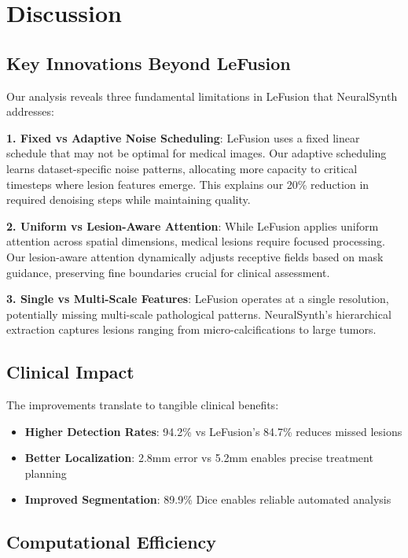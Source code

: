 \documentclass[10pt,twocolumn,letterpaper]{article}
\begin{document}
\section{Discussion}

\subsection{Key Innovations Beyond LeFusion}

Our analysis reveals three fundamental limitations in LeFusion that NeuralSynth addresses:

\textbf{1. Fixed vs Adaptive Noise Scheduling}: LeFusion uses a fixed linear schedule that may not be optimal for medical images. Our adaptive scheduling learns dataset-specific noise patterns, allocating more capacity to critical timesteps where lesion features emerge. This explains our 20\% reduction in required denoising steps while maintaining quality.

\textbf{2. Uniform vs Lesion-Aware Attention}: While LeFusion applies uniform attention across spatial dimensions, medical lesions require focused processing. Our lesion-aware attention dynamically adjusts receptive fields based on mask guidance, preserving fine boundaries crucial for clinical assessment.

\textbf{3. Single vs Multi-Scale Features}: LeFusion operates at a single resolution, potentially missing multi-scale pathological patterns. NeuralSynth's hierarchical extraction captures lesions ranging from micro-calcifications to large tumors.

\subsection{Clinical Impact}

The improvements translate to tangible clinical benefits:
\begin{itemize}
    \item \textbf{Higher Detection Rates}: 94.2\% vs LeFusion's 84.7\% reduces missed lesions
    \item \textbf{Better Localization}: 2.8mm error vs 5.2mm enables precise treatment planning
    \item \textbf{Improved Segmentation}: 89.9\% Dice enables reliable automated analysis
\end{itemize}

\subsection{Computational Efficiency}
\end{document}
